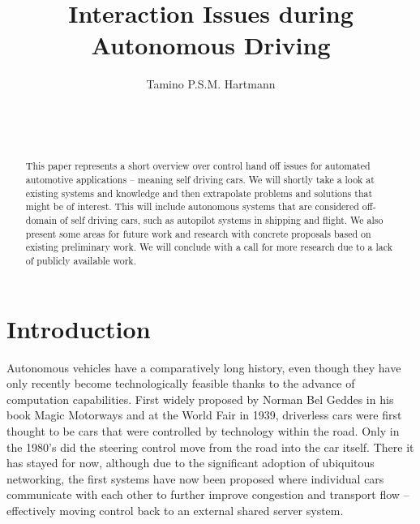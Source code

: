 \documentclass{acm_proc_article-sp}
\begin{document}

\title{Interaction Issues during Autonomous Driving}

\author{
\alignauthor
Tamino P.S.M. Hartmann\\
       \\
       \\
       \\
}



\maketitle
\begin{abstract}
This paper represents a short overview over control hand off issues for automated automotive applications – meaning self driving cars.
We will shortly take a look at existing systems and knowledge and then extrapolate problems and solutions that might be of interest.
This will include autonomous systems that are considered off-domain of self driving cars, such as autopilot systems in shipping and flight.
We also present some areas for future work and research with concrete proposals based on existing preliminary work.
We will conclude with a call for more research due to a lack of publicly available work.
\end{abstract}


\section{Introduction}

Autonomous vehicles have a comparatively long history, even though they have only recently become technologically feasible thanks to the advance of computation capabilities.
First widely proposed by Norman Bel Geddes in his book Magic Motorways \cite{geddes2009magic} and at the World Fair in 1939, driverless cars were first thought to be cars that were controlled by technology within the road.
Only in the 1980's did the steering control move from the road into the car itself.
There it has stayed for now, although due to the significant adoption of ubiquitous networking, the first systems have now been proposed where individual cars communicate with each other to further improve congestion and transport flow – effectively moving control back to an external shared server system.
\end{document}
